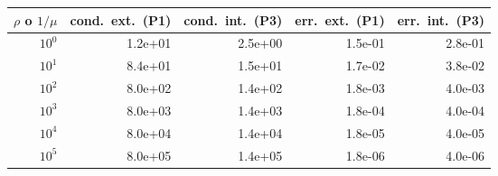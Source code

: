 \begin{tabular}{rrrrr}\toprule
$\rho$ o $1/\mu$ & cond.\ ext.\ (P1) & cond.\ int.\ (P3) & err.\ ext.\ (P1) & err.\ int.\ (P3)\\\midrule
$10^{0}$ & 1.2e+01 & 2.5e+00 & 1.5e-01 & 2.8e-01\\
$10^{1}$ & 8.4e+01 & 1.5e+01 & 1.7e-02 & 3.8e-02\\
$10^{2}$ & 8.0e+02 & 1.4e+02 & 1.8e-03 & 4.0e-03\\
$10^{3}$ & 8.0e+03 & 1.4e+03 & 1.8e-04 & 4.0e-04\\
$10^{4}$ & 8.0e+04 & 1.4e+04 & 1.8e-05 & 4.0e-05\\
$10^{5}$ & 8.0e+05 & 1.4e+05 & 1.8e-06 & 4.0e-06\\
\bottomrule\end{tabular}
